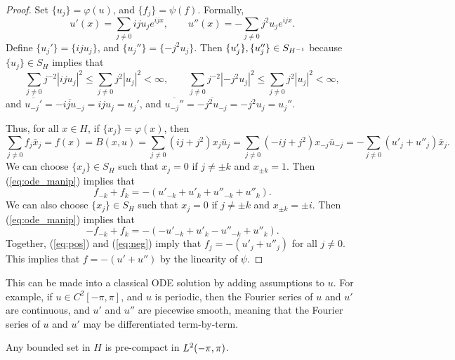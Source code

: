 \documentclass{homework}
\begin{document}
\begin{arabicparts}
\begin{proof}
			Set $\{u_j\} = \varphi(u)$, and $\{f_j\} = \psi(f)$. Formally,
			\begin{equation}
				\label{eq:formal_deriv}
				u'(x) = \sum_{j\ne0}iju_je^{ijx}, \qquad u''(x) = -\sum_{j\ne0}j^2u_je^{ijx}.
			\end{equation}
			Define $\{u_j'\} = \{iju_j\}$, and $\{u_j''\} = \{-j^2u_j\}$. Then $\{u_j'\}, \{u_j''\} \in S_{H^{-1}}$ because $\{u_j\} \in S_H$ implies that
			\begin{equation}
				\sum_{j\ne0}j^{-2}|iju_j|^2 \le \sum_{j\ne0} j^2|u_j|^2 < \infty, \qquad \sum_{j\ne0}j^{-2}|-j^2u_j|^2 \le \sum_{j\ne0}j^2|u_j|^2 < \infty,
			\end{equation}
			and $\overline{u_{-j}'} = \overline{-iju_{-j}} =iju_j=u_j'$, and $\overline{u_{-j}''} = \overline{-j^2u_{-j}} = -j^2u_j = u_j''$.
			
			Thus, for all $x\in H$, if $\{x_j\} = \varphi(x)$, then
			\begin{equation}
				\label{eq:ode_manip}
				 \sum_{j\ne0}f_j\bar{x}_j = f(x) = B(x,u)= \sum_{j\ne0}(ij + j^2)x_j\bar{u}_j = \sum_{j\ne 0}(-ij+j^2)x_{-j}\bar{u}_{-j} = -\sum_{j\ne0}(u'_j + u''_j)\bar{x}_j.
			\end{equation}
			We can choose $\{x_j\} \in S_H$ such that $x_j = 0$ if $j \ne \pm k$ and $x_{\pm k} = 1$. Then (\ref{eq:ode_manip}) implies that
			\begin{equation}
				\label{eq:pos}
				f_{-k} + f_k = -(u'_{-k} + u'_k + u''_{-k}+u''_k).
			\end{equation}
			We can also choose $\{x_j\} \in S_H$ such that $x_j = 0$ if $j\ne \pm k$ and $x_{\pm k} = \pm i$. Then (\ref{eq:ode_manip}) implies that
			\begin{equation}
				\label{eq:neg}
				-f_{-k} + f_k = -(-u'_{-k} + u'_k -u''_{-k} + u''_k).
			\end{equation}
			Together, (\ref{eq:pos}) and (\ref{eq:neg}) imply that $f_j = -(u'_j + u''_j)$ for all $j\ne0$. This implies that $f = -(u' + u'')$ by the linearity of $\psi$.
			
			\end{proof}
			
		This can be made into a classical ODE solution by adding assumptions to $u$. For example, if $u \in C^2[-\pi,\pi]$, and $u$ is periodic, then the Fourier series of $u$ and $u'$ are continuous, and $u'$ and $u''$ are piecewise smooth, meaning that the Fourier series of $u$ and $u'$ may be differentiated term-by-term.
		
		\questionpart
		Any bounded set in $H$ is pre-compact in ${L^2(-\pi,\pi)}$.
		

\end{arabicparts}
\end{document}
